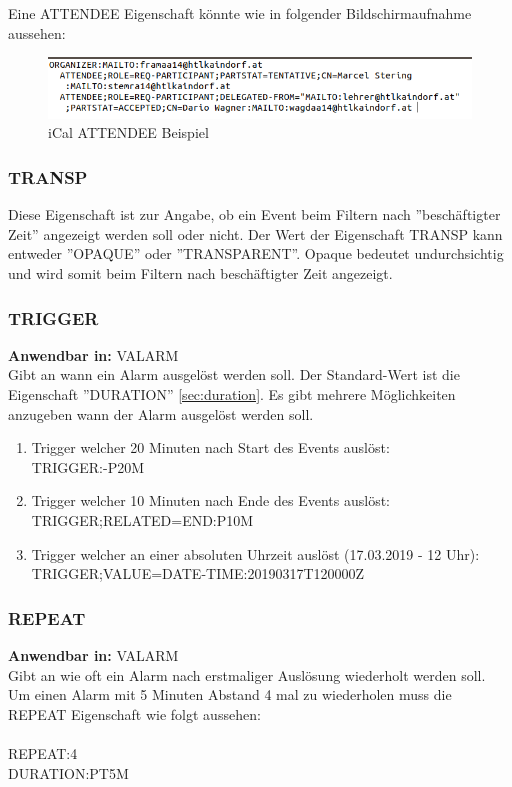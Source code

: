 Eine ATTENDEE Eigenschaft könnte wie in folgender Bildschirmaufnahme aussehen: \\
\begin{figure}[h]
	\centering
    \includegraphics[width=\textwidth]{images/iCal_Format_attendee}
    \caption{iCal ATTENDEE Beispiel}
    \label{fig:netFramework}
\end{figure}
\subsubsection{TRANSP}
\label{sec:transp}
Diese Eigenschaft ist zur Angabe, ob ein Event beim Filtern nach ''beschäftigter Zeit'' angezeigt werden soll oder nicht. Der Wert der Eigenschaft TRANSP kann entweder ''OPAQUE'' oder ''TRANSPARENT''. Opaque bedeutet undurchsichtig und wird somit beim Filtern nach beschäftigter Zeit angezeigt.
\subsubsection{TRIGGER}
\label{sec:trigger}
\textbf{Anwendbar in:} VALARM \\
Gibt an wann ein Alarm ausgelöst werden soll. Der Standard-Wert ist die Eigenschaft ''DURATION'' \ref{sec:duration}. Es gibt mehrere Möglichkeiten anzugeben wann der Alarm ausgelöst werden soll. 
\begin{enumerate}
\item Trigger welcher 20 Minuten nach Start des Events auslöst: \\TRIGGER:-P20M\\
\item Trigger welcher 10 Minuten nach Ende des Events auslöst: \\TRIGGER;RELATED=END:P10M\\
\item Trigger welcher an einer absoluten Uhrzeit auslöst (17.03.2019 - 12 Uhr): \\TRIGGER;VALUE=DATE-TIME:20190317T120000Z\\
\end{enumerate}
\subsubsection{REPEAT}
\label{sec:repeat}
\textbf{Anwendbar in:} VALARM \\
Gibt an wie oft ein Alarm nach erstmaliger Auslösung wiederholt werden soll. Um einen Alarm mit 5 Minuten Abstand 4 mal zu wiederholen muss die REPEAT Eigenschaft wie folgt aussehen: \\ \\ REPEAT:4\\DURATION:PT5M
\renewcommand{\theauthor}{Dario Wagner}
